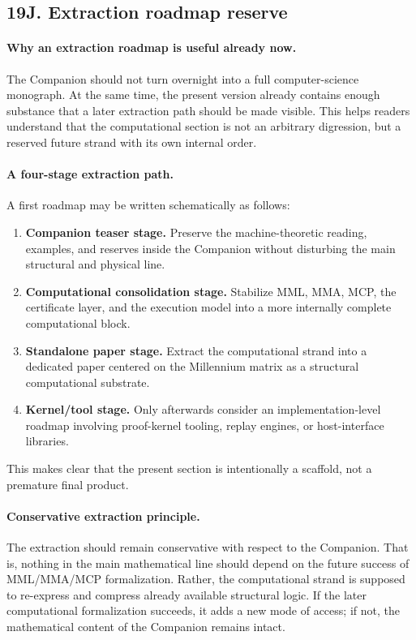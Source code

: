 \subsection*{19J. Extraction roadmap reserve}

\paragraph{Why an extraction roadmap is useful already now.}
The Companion should not turn overnight into a full computer-science monograph. At the same time, the present version already contains enough substance that a later extraction path should be made visible. This helps readers understand that the computational section is not an arbitrary digression, but a reserved future strand with its own internal order.

\paragraph{A four-stage extraction path.}
A first roadmap may be written schematically as follows:
\begin{enumerate}[leftmargin=2em]
  \item \textbf{Companion teaser stage.} Preserve the machine-theoretic reading, examples, and reserves inside the Companion without disturbing the main structural and physical line.
  \item \textbf{Computational consolidation stage.} Stabilize MML, MMA, MCP, the certificate layer, and the execution model into a more internally complete computational block.
  \item \textbf{Standalone paper stage.} Extract the computational strand into a dedicated paper centered on the Millennium matrix as a structural computational substrate.
  \item \textbf{Kernel/tool stage.} Only afterwards consider an implementation-level roadmap involving proof-kernel tooling, replay engines, or host-interface libraries.
\end{enumerate}
This makes clear that the present section is intentionally a scaffold, not a premature final product.

\paragraph{Conservative extraction principle.}
The extraction should remain conservative with respect to the Companion. That is, nothing in the main mathematical line should depend on the future success of MML/MMA/MCP formalization. Rather, the computational strand is supposed to re-express and compress already available structural logic. If the later computational formalization succeeds, it adds a new mode of access; if not, the mathematical content of the Companion remains intact.

